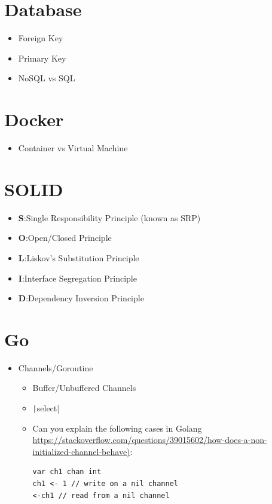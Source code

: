 \documentclass[]{article}
\begin{document}
\begin{multicols}{2}
  \section{Database}

  \begin{itemize}
    \item Foreign Key
    \item Primary Key
    \item NoSQL vs SQL
  \end{itemize}

  \section{Docker}

  \begin{itemize}
    \item Container vs Virtual Machine
  \end{itemize}

  \section{SOLID}

  \begin{itemize}
    \item \textbf{S}:\@ Single Responsibility Principle (known as SRP)
    \item \textbf{O}:\@ Open/Closed Principle
    \item \textbf{L}:\@ Liskov’s Substitution Principle
    \item \textbf{I}:\@ Interface Segregation Principle
    \item \textbf{D}:\@ Dependency Inversion Principle
  \end{itemize}

  \section{Go}

  \begin{itemize}
    \item Channels/Goroutine
      \begin{itemize}
        \item Buffer/Unbuffered Channels
        \item \texttt|select|
        \item Can you explain the following cases in Golang \href{Answer}{https://stackoverflow.com/questions/39015602/how-does-a-non-initialized-channel-behave)}:
          \begin{verbatim}
var ch1 chan int
ch1 <- 1 // write on a nil channel
<-ch1 // read from a nil channel


\end{verbatim}
\end{itemize}
\end{itemize}
\end{multicols}
\end{document}
